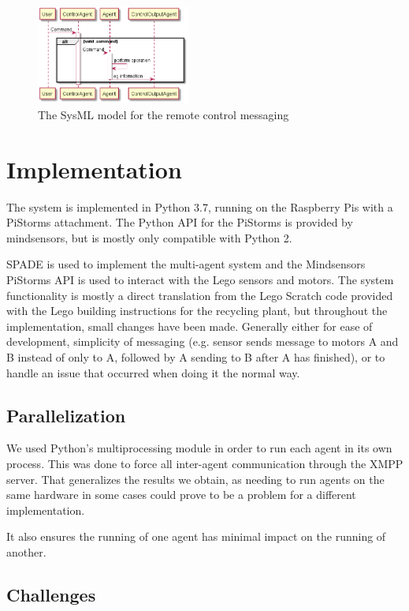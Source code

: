 \documentclass[conference]{IEEEtran}
\begin{document}
\begin{figure}[htbp]
\centerline{\includegraphics[width=0.45\textwidth]{sysml/control.png}}
\caption{The SysML\cite{sysml} model for the remote control messaging}
\label{control}
\end{figure}

\section{Implementation}

The system is implemented in Python 3.7, running on the Raspberry Pis with a PiStorms attachment. The Python API for the PiStorms is provided by mindsensors, but is mostly only compatible with Python 2. 

SPADE is used to implement the multi-agent system and the Mindsensors PiStorms API is used to interact with the Lego sensors and motors. The system functionality is mostly a direct translation from the Lego Scratch code provided with the Lego building instructions for the recycling plant, but throughout the implementation, small changes have been made. Generally either for ease of development, simplicity of messaging (e.g. sensor sends message to motors A and B instead of only to A, followed by A sending to B after A has finished), or to handle an issue that occurred when doing it the normal way. 

\subsection{Parallelization}

We used Python's multiprocessing module in order to run each agent in its own process. This was done to force all inter-agent communication through the XMPP server. That generalizes the results we obtain, as needing to run agents on the same hardware in some cases could prove to be a problem for a different implementation.

It also ensures the running of one agent has minimal impact on the running of another. 

\subsection{Challenges}
\end{document}
